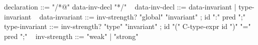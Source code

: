 \begin{syntax}
  declaration ::= { "/*@" data-inv-decl "*/" }
  \
  { data-inv-decl } ::= { data-invariant } | { type-invariant }
  \
  { data-invariant } ::= { { inv-strength? } "global" "invariant" } ;
                      { id ":" pred ";" } 
  \
  { type-invariant } ::= { { inv-strength? } "type" "invariant" };
                      { id "(" C-type-expr id ")" "=" pred ";" }
  \
  { inv-strength } ::= { "weak" } | { "strong" }
\end{syntax}
